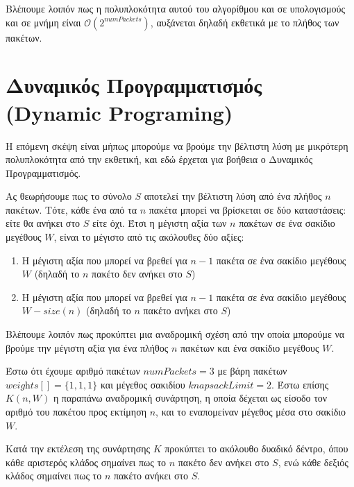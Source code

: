 \documentclass{article}
\begin{document}
Βλέπουμε λοιπόν πως η πολυπλοκότητα αυτού του αλγορίθμου και σε υπολογισμούς και
σε μνήμη είναι $\mathcal{O}\left(2^{\textit{numPackets}}\right)$, αυξάνεται
δηλαδή εκθετικά με το πλήθος των πακέτων.

\section{Δυναμικός Προγραμματισμός (Dynamic Programing)}

Η επόμενη σκέψη είναι μήπως μπορούμε να βρούμε την βέλτιστη λύση με μικρότερη
πολυπλοκότητα από την εκθετική, και εδώ έρχεται για βοήθεια ο Δυναμικός
Προγραμματισμός.

Ας θεωρήσουμε πως το σύνολο $S$ αποτελεί την βέλτιστη λύση από ένα πλήθος $n$
πακέτων. Τότε, κάθε ένα από τα $n$ πακέτα μπορεί να βρίσκεται σε δύο
καταστάσεις: είτε θα ανήκει στο $S$ είτε όχι. Έτσι η μέγιστη αξία των $n$
πακέτων σε ένα σακίδιο μεγέθους $W$, είναι το μέγιστο από τις ακόλουθες δύο
αξίες:

\begin{enumerate}
    \item Η μέγιστη αξία που μπορεί να βρεθεί για $n-1$ πακέτα σε ένα σακίδιο
            μεγέθους $W$ (δηλαδή το $n$ πακέτο δεν ανήκει στο $S$)
    \item Η μέγιστη αξία που μπορεί να βρεθεί για $n-1$ πακέτα σε ένα σακίδιο
            μεγέθους $W-\textit{size}(n)$ (δηλαδή το $n$ πακέτο ανήκει στο $S$)
\end{enumerate}

Βλέπουμε λοιπόν πως προκύπτει μια αναδρομική σχέση από την οποία μπορούμε να
βρούμε την μέγιστη αξία για ένα πλήθος $n$ πακέτων και ένα σακίδιο μεγέθους $W$.

Έστω ότι έχουμε αριθμό πακέτων $\textit{numPackets}=3$ με βάρη πακέτων
$\textit{weights}[]=\{1, 1, 1\}$ και μέγεθος σακιδίου
$\textit{knapsackLimit}=2$. Έστω επίσης $K(n, W)$ η παραπάνω αναδρομική
συνάρτηση, η οποία δέχεται ως είσοδο τον αριθμό του πακέτου προς εκτίμηση $n$,
και το εναπομείναν μέγεθος μέσα στο σακίδιο $W$.

Κατά την εκτέλεση της συνάρτησης $K$ προκύπτει το ακόλουθο δυαδικό δέντρο, όπου
κάθε αριστερός κλάδος σημαίνει πως το $n$ πακέτο δεν ανήκει στο $S$, ενώ
κάθε δεξιός κλάδος σημαίνει πως το $n$ πακέτο ανήκει στο $S$.

\begin{center}
\end{center}
\end{document}
